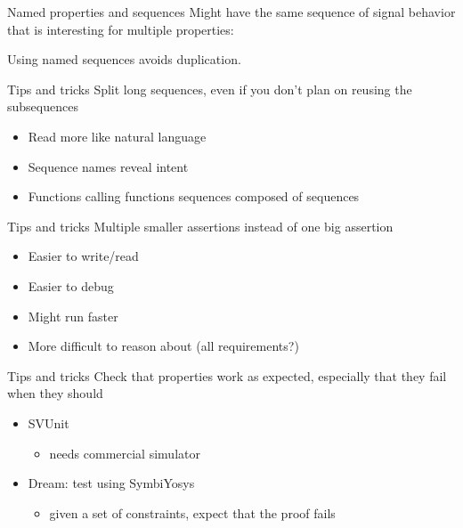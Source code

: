 \documentclass{beamer}
\begin{document}
\begin{frame}[fragile]{Named properties and sequences}
Might have the same sequence of signal behavior that is interesting for multiple properties:


Using named sequences avoids duplication.
\end{frame}


\begin{frame}{Tips and tricks}
Split long sequences, even if you don't plan on reusing the subsequences

\begin{itemize}
 \item Read more like natural language
 \item Sequence names reveal intent
 \item Functions calling functions \textrightarrow{} sequences composed of sequences
\end{itemize}
\end{frame}


\begin{frame}{Tips and tricks}
Multiple smaller assertions instead of one big assertion

\begin{itemize}
 \item Easier to write/read
 \item Easier to debug
 \item Might run faster
 \item More difficult to reason about (all requirements?)
\end{itemize}
\end{frame}


\begin{frame}{Tips and tricks}
Check that properties work as expected, especially that they fail when they should

\begin{itemize}
 \item SVUnit
  \begin{itemize}
   \item needs commercial simulator
  \end{itemize}
 \item Dream: test using SymbiYosys
  \begin{itemize}
   \item given a set of constraints, expect that the proof fails
  \end{itemize}
\end{itemize}
\end{frame}
\end{document}
